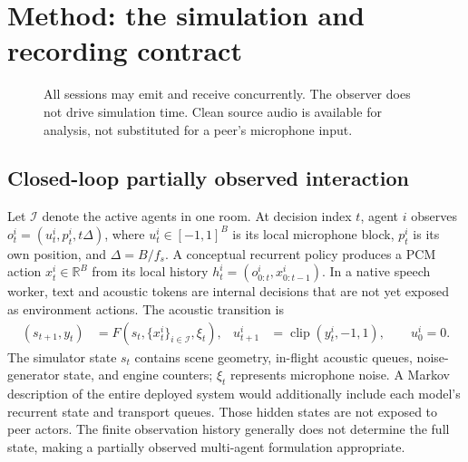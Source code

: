 \documentclass{article}
\begin{document}
\section{Method: the simulation and recording contract}
\begin{figure}[t]
\centering
{}
\caption{All sessions may emit and receive concurrently. The observer does not drive simulation time. Clean source audio is available for analysis, not substituted for a peer's microphone input.}
\end{figure}

\subsection{Closed-loop partially observed interaction}
Let $\mathcal I$ denote the active agents in one room. At decision index $t$, agent $i$ observes $o^i_t=(u^i_t,p^i_t,t\Delta)$, where $u^i_t\in[-1,1]^B$ is its local microphone block, $p^i_t$ is its own position, and $\Delta=B/f_s$. A conceptual recurrent policy produces a PCM action $x^i_t\in\mathbb R^B$ from its local history $h^i_t=(o^i_{0:t},x^i_{0:t-1})$. In a native speech worker, text and acoustic tokens are internal decisions that are not yet exposed as environment actions. The acoustic transition is
\begin{align}
 (s_{t+1},y_t)&=F(s_t,\{x^i_t\}_{i\in\mathcal I},\xi_t), &
 u^i_{t+1}&=\operatorname{clip}(y^i_t,-1,1),\qquad u^i_0=0.
\end{align}
The simulator state $s_t$ contains scene geometry, in-flight acoustic queues, noise-generator state, and engine counters; $\xi_t$ represents microphone noise. A Markov description of the entire deployed system would additionally include each model's recurrent state and transport queues. Those hidden states are not exposed to peer actors. The finite observation history generally does not determine the full state, making a partially observed multi-agent formulation appropriate.
\end{document}
